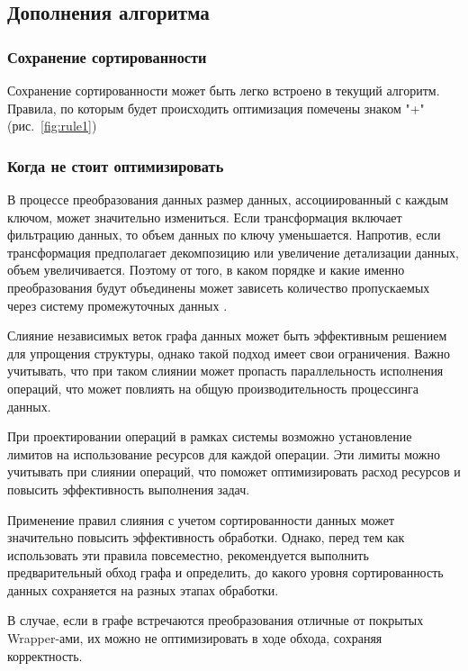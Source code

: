 \subsection{Дополнения алгоритма}

\subsubsection{Сохранение сортированности}

Сохранение сортированности может быть легко встроено в текущий алгоритм. Правила, по которым будет происходить оптимизация помечены знаком "+" (рис.~\ref{fig:rule1})

\subsubsection{Когда не стоит оптимизировать}

В процессе преобразования данных размер данных, ассоциированный с каждым ключом, может значительно измениться. Если трансформация включает фильтрацию данных, то объем данных по ключу уменьшается. Напротив, если трансформация предполагает декомпозицию или увеличение детализации данных, объем увеличивается. Поэтому от того, в каком порядке и какие именно преобразования будут объединены может зависеть количество пропускаемых через систему промежуточных данных \cite{flume}.

Слияние независимых веток графа данных может быть эффективным решением для упрощения структуры, однако такой подход имеет свои ограничения. Важно учитывать, что при таком слиянии может пропасть параллельность исполнения операций, что может повлиять на общую производительность процессинга данных.

При проектировании операций в рамках системы возможно установление лимитов на использование ресурсов для каждой операции. Эти лимиты можно учитывать при слиянии операций, что поможет оптимизировать расход ресурсов и повысить эффективность выполнения задач.

Применение правил слияния с учетом сортированности данных может значительно повысить эффективность обработки. Однако, перед тем как использовать эти правила повсеместно, рекомендуется выполнить предварительный обход графа и определить, до какого уровня сортированность данных сохраняется на разных этапах обработки.

В случае, если в графе встречаются преобразования отличные от покрытых Wrapper-ами, их можно не оптимизировать в ходе обхода, сохраняя корректность.
